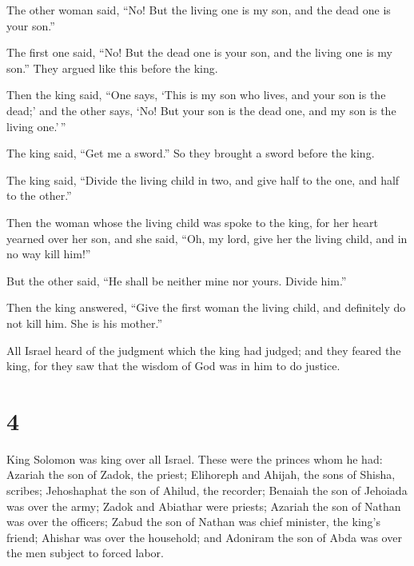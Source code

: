  The other woman said, ``No! But the living one is my
son, and the dead one is your son.''

The first one said, ``No! But the dead one is your son, and the living
one is my son.'' They argued like this before the king.

 Then the king said, ``One says, `This is my son who
lives, and your son is the dead;' and the other says, `No! But your son
is the dead one, and my son is the living one.'\,''

 The king said, ``Get me a sword.'' So they brought a
sword before the king.

 The king said, ``Divide the living child in two, and
give half to the one, and half to the other.''

 Then the woman whose the living child was spoke to the
king, for her heart yearned over her son, and she said, ``Oh, my lord,
give her the living child, and in no way kill him!''

But the other said, ``He shall be neither mine nor yours. Divide him.''

 Then the king answered, ``Give the first woman the
living child, and definitely do not kill him. She is his mother.''

 All Israel heard of the judgment which the king had
judged; and they feared the king, for they saw that the wisdom of God
was in him to do justice.

\hypertarget{section-3}{%
\section{4}\label{section-3}}

 King Solomon was king over all Israel. 
These were the princes whom he had: Azariah the son of Zadok, the
priest;  Elihoreph and Ahijah, the sons of Shisha,
scribes; Jehoshaphat the son of Ahilud, the recorder; 
Benaiah the son of Jehoiada was over the army; Zadok and Abiathar were
priests;  Azariah the son of Nathan was over the officers;
Zabud the son of Nathan was chief minister, the king's friend;
 Ahishar was over the household; and Adoniram the son of
Abda was over the men subject to forced labor.


